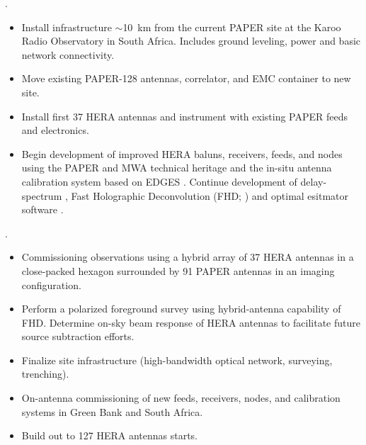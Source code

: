 \documentclass[preprint]{aastex}
\begin{document}
.  
\begin{itemize}\setlength{\parskip}{0pt}\itemsep0pt
\vspace{-7pt}
  \item Install infrastructure $\sim$10~km from the current PAPER site at the Karoo Radio Observatory in South Africa. Includes ground leveling, power and basic network connectivity.
  \item Move existing PAPER-128 antennas, correlator, and EMC container to new site.
  \item Install first 37 HERA antennas and instrument with existing PAPER feeds and electronics. 
  \item Begin development of improved HERA baluns, receivers, feeds, and 
nodes using the PAPER and MWA technical heritage \citep{bradley_et_al2005,lonsdale_et_al2009_trunc,tingay_et_al2013_trunc} 
and the in-situ antenna calibration system based 
on EDGES \citep{rogers_2012}. Continue development of delay-spectrum \citep{parsons_et_al2012b}, 
Fast Holographic Deconvolution (FHD; \citealt{sullivan_et_al2012_trunc}) and 
optimal esitmator software \citep{dillon_et_al2013b_trunc}.
\end{itemize}


.  
\begin{itemize}\setlength{\parskip}{0pt}\itemsep0pt
\vspace{-7pt}
  \item Commissioning observations using a hybrid array of 37 HERA antennas in a close-packed hexagon surrounded by 91 PAPER antennas in an imaging configuration.
  \item Perform a polarized foreground survey using hybrid-antenna capability of FHD. Determine on-sky beam response of HERA antennas to facilitate future source subtraction efforts.
  \item Finalize site infrastructure (high-bandwidth optical network, surveying, trenching).
  \item On-antenna commissioning of new feeds, receivers, nodes, and calibration systems in Green Bank and South Africa.
  \item Build out to 127 HERA antennas starts.
\end{itemize}
\end{document}
